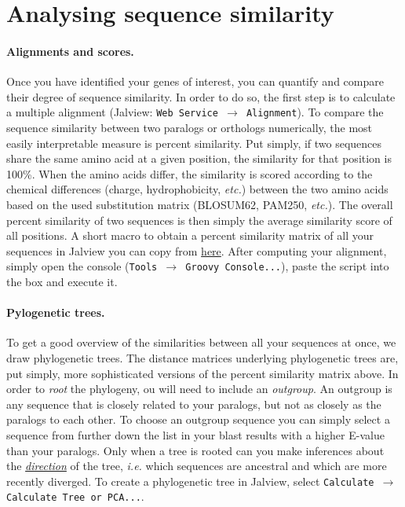 \documentclass[11pt]{article}
\begin{document}
	\section{Analysing sequence similarity\label{sec:phylo}}
	
	\paragraph*{Alignments and scores.} Once you have identified your genes of interest, you can quantify and compare their degree of sequence similarity.
	In order to do so, the first step is to calculate a multiple alignment (Jalview: \texttt{Web Service $\rightarrow$ Alignment}).
	To compare the sequence similarity between two paralogs or orthologs numerically, the most easily interpretable measure is percent similarity. 
	Put simply, if two sequences share the same amino acid at a given position, the similarity for that position is 100\%. 
	When the amino acids differ, the similarity is scored according to the chemical differences (charge, hydrophobicity, \textit{etc.}) between the two amino acids based on the used substitution matrix (BLOSUM62, PAM250, \textit{etc.}). 
	The overall percent similarity of two sequences is then simply the average similarity score of all positions. 
	A short macro to obtain a percent similarity matrix of all your sequences in Jalview you can copy from \href{https://github.com/leonardblaschek/teaching/blob/master/bioinformatics/jalview_simmat.txt}{here}. 
	After computing your alignment, simply open the console (\texttt{Tools $\rightarrow$ Groovy Console...}), paste the script into the box and execute it.
	
	\paragraph*{Pylogenetic trees.}To get a good overview of the similarities between all your sequences at once, we draw phylogenetic trees. The distance matrices underlying phylogenetic trees are, put simply, more sophisticated versions of the percent similarity matrix above. In order to \textit{root} the phylogeny, ou will need to include an \textit{outgroup}. An outgroup is any sequence that is closely related to your paralogs, but not as closely as the paralogs to each other. To choose an outgroup sequence you can simply select a sequence from further down the list in your blast results with a higher E-value than your paralogs. Only when a tree is rooted can you make inferences about the \href{https://evolution.berkeley.edu/evolibrary/article/evo_05}{\textit{direction}} of the tree, \textit{i.e.} which sequences are ancestral and which are more recently diverged. To create a phylogenetic tree in Jalview, select \texttt{Calculate $\rightarrow$ Calculate Tree or PCA...}.
	
\end{document}
